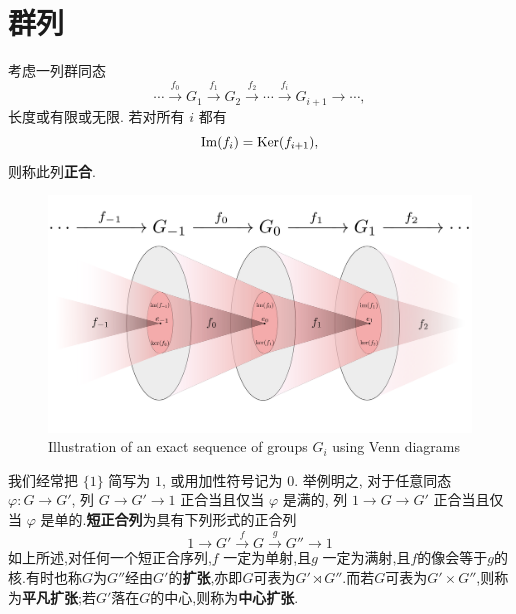 \section{群列}
\begin{definition}\label{def:exact-seq-group}
	考虑一列群同态
	\[ \cdots \xrightarrow{f_0} G_1 \xrightarrow{f_1} G_2 \xrightarrow{f_2} \cdots \xrightarrow{f_i} G_{i+1} \to \cdots, \]
	长度或有限或无限. 若对所有 $i$ 都有
	\[ \operatorname{\mathrm{Im}}(f_i) = \operatorname{\mathrm{Ker}}(f_{i+1}), \]
	则称此列\textbf{正合}. 
	\begin{figure}[htp]
		\centering
		\includegraphics[scale=0.15]{Exact_Sequence_of_Groups}
		\caption{Illustration of an exact sequence of groups $G_{i}$ using Venn diagrams}
	\end{figure}
	我们经常把 $\{1\}$ 简写为 $1$, 或用加性符号记为 $0$. 举例明之, 对于任意同态 $\varphi: G \to G'$, 列 $G \to G' \to 1$ 正合当且仅当 $\varphi$ 是满的, 列 $1 \to G \to G'$ 正合当且仅当 $\varphi$ 是单的.\textbf{短正合列}为具有下列形式的正合列
	\[ 1 \to G' \xrightarrow{f} G \xrightarrow{g} G''  \to 1 \]
	如上所述,对任何一个短正合序列,$f$ 一定为单射,且$g$ 一定为满射,且$f$的像会等于$g$的核.有时也称$G$为$G''$经由$G'$的\textbf{扩张},亦即$G$可表为$G'\rtimes G''$.而若$G$可表为$G'\times G''$,则称为\textbf{平凡扩张};若$G'$落在$G$的中心,则称为\textbf{中心扩张}.
\end{definition}

